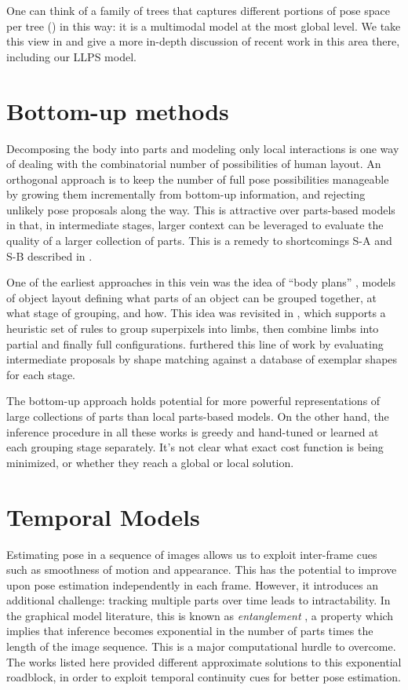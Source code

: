 One can think of a family of trees that captures different portions of pose 
space per tree () in this way: it is a multimodal model at the 
most global level.  We take this view in  and give a more 
in-depth discussion of recent work in this area there, including our LLPS 
model.


\section{Bottom-up methods}
Decomposing the body into parts and modeling only local interactions is one way 
of dealing with the combinatorial number of possibilities of human layout. An 
orthogonal approach is to keep the number of full pose possibilities manageable 
by growing them incrementally from bottom-up information, and rejecting 
unlikely pose proposals along the way.  This is attractive over parts-based 
models in that, in intermediate stages, larger context can be leveraged to 
evaluate the quality of a larger collection of parts. This is a remedy to 
shortcomings S-A and S-B described in .

One of the earliest approaches in this vein was the idea of ``body plans'' 
\citep{bodyplans}, models of object layout defining what parts of an object can 
be grouped together, at what stage of grouping, and how.  This idea was 
revisited in \citep{mori04}, which supports a heuristic set of rules to group 
superpixels into limbs, then combine limbs into partial and finally full 
configurations.  \citet{praveen07} furthered this line of work by evaluating 
intermediate proposals by shape matching against a database of exemplar shapes 
for each stage.

The bottom-up approach holds potential for more powerful representations of 
large collections of parts than local parts-based models.  On the other hand, 
the inference procedure in all these works is greedy and hand-tuned or learned 
at each grouping stage separately.  It's not clear what exact cost function is 
being minimized, or whether they reach a global or local solution.


\section{Temporal Models}\label{sec:rel-video}

Estimating pose in a sequence of images allows us to exploit inter-frame cues 
such as smoothness of motion and appearance.  This has the potential to improve 
upon pose estimation independently in each frame.  However, it introduces an
additional challenge: tracking multiple parts over time leads to 
intractability.  In the graphical model literature, this is known as {\em 
entanglement } \citep{koller-book}, a property which implies that inference 
becomes exponential in the number of parts times the length of the image 
sequence.  This is a major computational hurdle to overcome.  The works listed 
here provided different approximate solutions to this exponential roadblock, in 
order to exploit temporal continuity cues for better pose estimation.

